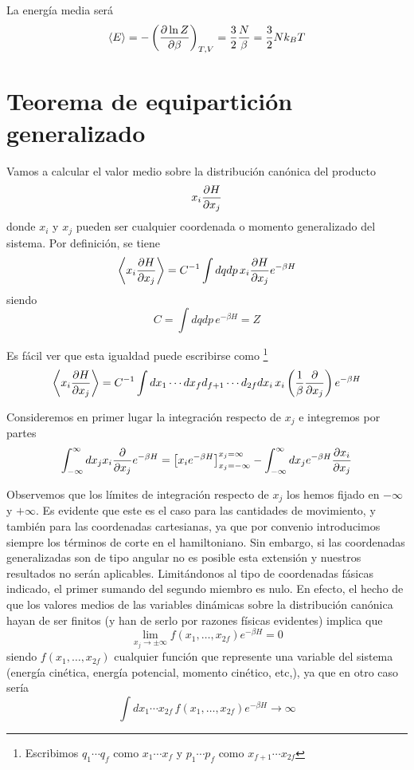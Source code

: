 La energía media será
\begin{equation}
	\expval{E} = - \left( \frac{\partial \ln Z}{\partial \beta}\right)_{T,V} = \frac{3}{2} \frac{N}{\beta} = \frac{3}{2} N k_B T
\end{equation}

\section{Teorema de equipartición generalizado}

Vamos a calcular el valor medio sobre la distribución canónica del producto
$$x_i\pdv{H}{x_j}$$
donde $x_i$ y $x_j$ pueden ser cualquier coordenada o momento generalizado del sistema.
Por definición, se tiene
\begin{equation}
	\expval{x_i\pdv{H}{x_j}}  = C^{-1} \int dqdp \, x_i\pdv{H}{x_j} e^{-\beta H}
\end{equation}
siendo
$$C = \int dqdp \, e^{-\beta H} = Z$$

Es fácil ver que esta igualdad puede escribirse como \footnote{Escribimos $q_1 \cdots q_f$ como $x_1 \cdots x_f$ y $p_1 \cdots p_f$ como $x_{f+1} \cdots x_{2f}$}
\begin{equation}
	\expval{x_i\pdv{H}{x_j}}  = C^{-1} \int dx_1\cdots dx_f d_{f+1} \cdots d_{2f} dx_i \, x_i\left( \frac{1}{\beta}\pdv{x_j} \right) e^{-\beta H}
\end{equation}

Consideremos en primer lugar la integración respecto de $x_j$ e integremos por partes
$$\int_{-\infty}^{\infty} dx_j x_i\pdv{x_j}e^{-\beta H} = \left[ x_ie^{-\beta H} \right]_{x_j = -\infty}^{x_j = \infty} - \int_{-\infty}^{\infty} dx_j e^{-\beta H}\pdv{x_i}{x_j}$$

Observemos que los límites de integración respecto de $x_j$ los hemos fijado en $-\infty$ y $+\infty$.
Es evidente que este es el caso para las cantidades de movimiento, y también para las coordenadas cartesianas, ya que por convenio introducimos siempre los términos de corte en el hamiltoniano.
Sin embargo, si las coordenadas generalizadas son de tipo angular no es posible esta extensión y nuestros resultados no serán aplicables.
Limitándonos al tipo de coordenadas fásicas indicado, el primer sumando del segundo miembro es nulo.
En efecto, el hecho de que los valores medios de las variables dinámicas sobre la distribución canónica hayan de ser finitos (y han de serlo por razones físicas evidentes) implica que
$$\lim\limits_{x_j\rightarrow \pm \infty} f(x_1,\ldots,x_{2f}) e^{-\beta H} = 0$$
siendo $f(x_1,\ldots,x_{2f})$ cualquier función que represente una variable del sistema (energía cinética, energía potencial, momento cinético, etc,), ya que en otro caso sería
$$\int dx_1\cdots x_{2f} \, f(x_1,\ldots,x_{2f})e^{-\beta H} \rightarrow \infty$$


